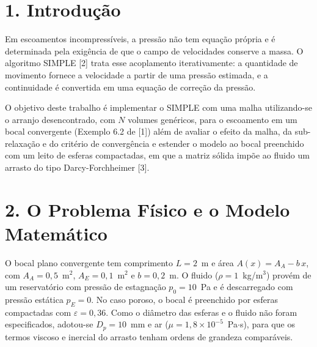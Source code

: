 
\providecommand{\pendente}[1]{\textcolor{red}{\textbf{[PENDENTE: #1]}}}

\renewcommand{\theequation}{\arabic{equation}}
\renewcommand{\thetable}{\arabic{table}}
\renewcommand{\thefigure}{\arabic{figure}}

\section*{1. Introdução}

Em escoamentos incompressíveis, a pressão não tem equação própria e é
determinada pela exigência de que o campo de velocidades conserve a massa.
O algoritmo SIMPLE [2] trata esse acoplamento iterativamente: a quantidade
de movimento fornece a velocidade a partir de uma pressão estimada, e a
continuidade é convertida em uma equação de correção da pressão.

O objetivo deste trabalho é implementar o SIMPLE com uma malha utilizando-se o arranjo desencontrado,
com $N$ volumes genéricos, para o escoamento em um bocal convergente (Exemplo 6.2
de [1]) além de avaliar o efeito da malha, da sub-relaxação e do critério de
convergência e estender o modelo ao bocal preenchido com um leito de
esferas compactadas, em que a matriz sólida impõe ao fluido um arrasto do
tipo Darcy-Forchheimer [3].

\section*{2. O Problema Físico e o Modelo Matemático}

O bocal plano convergente tem comprimento $L=2$~m e área
$A(x)=A_A-b\,x$, com $A_A=0{,}5$~m$^2$, $A_E=0{,}1$~m$^2$ e $b=0{,}2$~m.
O fluido ($\rho=1$~kg/m$^3$) provém de um reservatório com pressão de
estagnação $p_0=10$~Pa e é descarregado com pressão estática $p_E=0$.
No caso poroso, o bocal é preenchido por esferas compactadas com
$\varepsilon=0{,}36$. Como o diâmetro das esferas e o fluido não foram
especificados, adotou-se $D_p=10$~mm e ar ($\mu=1{,}8\times10^{-5}$~Pa$\cdot$s),
para que os termos viscoso e inercial do arrasto tenham ordens de grandeza
comparáveis.

